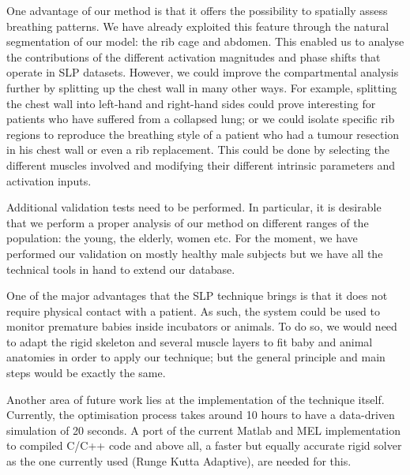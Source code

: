 One advantage of our method is that it offers the possibility to spatially assess breathing patterns. We have already exploited this feature through the natural segmentation of our model: the rib cage and abdomen. This enabled us to analyse the contributions of the different activation magnitudes and phase shifts that operate in SLP datasets. However, we could improve the compartmental analysis further by splitting up the chest wall in many other ways. For example, splitting the chest wall into left-hand and right-hand sides could prove interesting for patients who have suffered from a collapsed lung; or we could isolate specific rib regions to reproduce the breathing style of a patient who had a tumour resection in his chest wall or even a rib replacement. This could be done by selecting the different muscles involved and modifying their different intrinsic parameters and activation inputs.

Additional validation tests need to be performed. In particular, it is desirable that we perform a proper analysis of our method on different ranges of the population: the young, the elderly, women etc. For the moment, we have performed our validation on mostly healthy male subjects but we have all the technical tools in hand to extend our database.

One of the major advantages that the SLP technique brings is that it does not require physical contact with a patient. As such, the system could be used to monitor premature babies inside incubators or animals. To do so, we would need to adapt the rigid skeleton and several muscle layers to fit baby and animal anatomies in order to apply our technique; but the general principle and main steps would be exactly the same.

Another area of future work lies at the implementation of the technique itself. Currently, the optimisation process takes around 10 hours to have a data-driven simulation of  20 seconds. A port of the current Matlab and MEL implementation to compiled C/C++ code and above all, a faster but equally accurate rigid solver as the one currently used (Runge Kutta Adaptive), are needed for this.